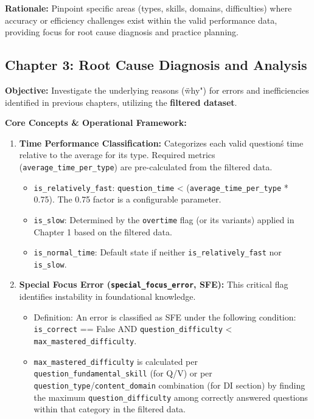 \documentclass{article}
\begin{document}
\textbf{Rationale:} Pinpoint specific areas (types, skills, domains, difficulties) where accuracy or efficiency challenges exist within the valid performance data, providing focus for root cause diagnosis and practice planning.

\subsection{Chapter 3: Root Cause Diagnosis and Analysis}

\textbf{Objective:} Investigate the underlying reasons (\"why") for errors and inefficiencies identified in previous chapters, utilizing the \textbf{filtered dataset}.

\textbf{Core Concepts \& Operational Framework:}
\begin{enumerate}
    \item \textbf{Time Performance Classification:} Categorizes each valid question\'s time relative to the average for its type. Required metrics (\texttt{average\_time\_per\_type}) are pre-calculated from the filtered data.
    \begin{itemize}
        \item \texttt{is\_relatively\_fast}: \texttt{question\_time} < (\texttt{average\_time\_per\_type} * 0.75). The 0.75 factor is a configurable parameter.
        \item \texttt{is\_slow}: Determined by the \texttt{overtime} flag (or its variants) applied in Chapter 1 based on the filtered data.
        \item \texttt{is\_normal\_time}: Default state if neither \texttt{is\_relatively\_fast} nor \texttt{is\_slow}.
    \end{itemize}
    \item \textbf{Special Focus Error (\texttt{special\_focus\_error}, SFE):} This critical flag identifies instability in foundational knowledge.
    \begin{itemize}
        \item Definition: An error is classified as SFE under the following condition:
        \texttt{is\_correct} == False AND \texttt{question\_difficulty} < \texttt{max\_mastered\_difficulty}.
        \item \texttt{max\_mastered\_difficulty} is calculated per \texttt{question\_fundamental\_skill} (for Q/V) or per \texttt{question\_type}/\texttt{content\_domain} combination (for DI section) by finding the maximum \texttt{question\_difficulty} among correctly answered questions within that category in the filtered data.

\end{itemize}
\end{enumerate}
\end{document}

